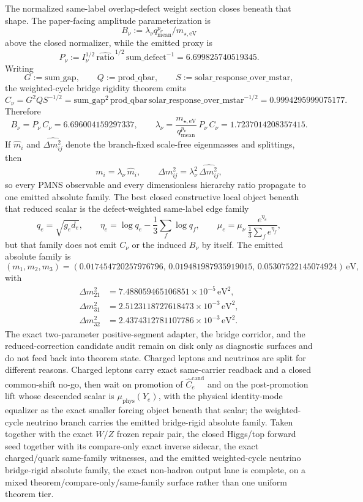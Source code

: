 \documentclass[11pt]{article}
\begin{document}
The normalized same-label overlap-defect weight section closes beneath that shape. The paper-facing amplitude parameterization is
\[
B_\nu:=\lambda_\nu q_{\mathrm{mean}}^{p_\nu}/m_{\star,\mathrm{eV}}
\]
above the closed normalizer, while the emitted proxy is
\[
P_\nu:=I_\nu^{1/2}\,\widehat{\mathrm{ratio}}^{\,1/2}\,\mathrm{sum\_defect}^{-1}=6.699825740519345.
\]
Writing
\[
G:=\mathrm{sum\_gap},
\qquad
Q:=\mathrm{prod\_qbar},
\qquad
S:=\mathrm{solar\_response\_over\_mstar},
\]
the weighted-cycle bridge rigidity theorem emits
\[
C_\nu
=
G^2Q S^{-1/2}
=
\mathrm{sum\_gap}^2\,\mathrm{prod\_qbar}\,\mathrm{solar\_response\_over\_mstar}^{-1/2}
=
0.9994295999075177.
\]
Therefore
\[
B_\nu=P_\nu\,C_\nu=6.696004159297337,
\qquad
\lambda_\nu=\frac{m_{\star,\mathrm{eV}}}{q_{\mathrm{mean}}^{p_\nu}}\,P_\nu\,C_\nu=1.7237014208357415.
\]
If \(\hat m_i\) and \(\widehat{\Delta m_{ij}^2}\) denote the branch-fixed scale-free eigenmasses and splittings, then
\[
m_i=\lambda_\nu\,\hat m_i,
\qquad
\Delta m_{ij}^2=\lambda_\nu^2\,\widehat{\Delta m_{ij}^2},
\]
so every PMNS observable and every dimensionless hierarchy ratio propagate to one emitted absolute family.
The best closed constructive local object beneath that reduced scalar is the defect-weighted same-label edge family
\[
q_e=\sqrt{g_e d_e},
\qquad
\eta_e=\log q_e-\frac13\sum_f \log q_f,
\qquad
\mu_e=\mu_\nu\,\frac{e^{\eta_e}}{\frac13\sum_f e^{\eta_f}},
\]
but that family does not emit \(C_\nu\) or the induced \(B_\nu\) by itself. The emitted absolute family is
\[
(m_1,m_2,m_3)=(0.017454720257976796,\,0.019481987935919015,\,0.05307522145074924)\,\mathrm{eV},
\]
with
\[
\begin{aligned}
\Delta m_{21}^2&=7.488059465106851\times10^{-5}\,\mathrm{eV}^2,\\
\Delta m_{31}^2&=2.5123118727618473\times10^{-3}\,\mathrm{eV}^2,\\
\Delta m_{32}^2&=2.4374312781107786\times10^{-3}\,\mathrm{eV}^2.
\end{aligned}
\]
The exact two-parameter positive-segment adapter, the bridge corridor, and the reduced-correction candidate audit remain on disk only as diagnostic surfaces and do not feed back into theorem state. Charged leptons and neutrinos are split for different reasons. Charged leptons carry exact same-carrier readback and a closed common-shift no-go, then wait on promotion of \(\widehat C_e^{\mathrm{cand}}\) and on the post-promotion lift whose descended scalar is \(\mu_{\mathrm{phys}}(Y_e)\), with the physical identity-mode equalizer as the exact smaller forcing object beneath that scalar; the weighted-cycle neutrino branch carries the emitted bridge-rigid absolute family.
Taken together with the exact \(W/Z\) frozen repair pair, the closed Higgs/top forward seed together with its compare-only exact inverse sidecar, the exact charged/quark same-family witnesses, and the emitted weighted-cycle neutrino bridge-rigid absolute family, the exact non-hadron output lane is complete, on a mixed theorem/compare-only/same-family surface rather than one uniform theorem tier.
\end{document}
